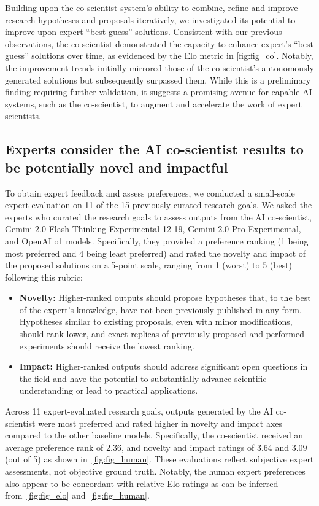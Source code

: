 Building upon the co-scientist system's ability to combine, refine and improve research hypotheses and proposals iteratively, we investigated its potential to improve upon expert ``best guess'' solutions. Consistent with our previous observations, the co-scientist demonstrated the capacity to enhance expert's ``best guess'' solutions over time, as evidenced by the Elo metric in \cref{fig:fig_co}. Notably, the improvement trends initially mirrored those of the co-scientist's autonomously generated solutions but subsequently surpassed them. While this is a preliminary finding requiring further validation, it suggests a promising avenue for capable AI systems, such as the co-scientist, to augment and accelerate the work of expert scientists.


\subsection{Experts consider the AI co-scientist results to be potentially novel and impactful}

To obtain expert feedback and assess preferences, we conducted a small-scale expert evaluation on 11 of the 15 previously curated research goals. We asked the experts who curated the research goals to assess outputs from the AI co-scientist, Gemini 2.0 Flash Thinking Experimental 12-19, Gemini 2.0 Pro Experimental, and OpenAI o1 models. Specifically, they provided a preference ranking (1 being most preferred and 4 being least preferred) and rated the novelty and impact of the proposed solutions on a 5-point scale, ranging from 1 (worst) to 5 (best) following this rubric:
\begin{itemize}
    \item \textbf{Novelty:} Higher-ranked outputs should propose hypotheses that, to the best of the expert's knowledge, have not been previously published in any form. Hypotheses similar to existing proposals, even with minor modifications, should rank lower, and exact replicas of previously proposed and performed experiments should receive the lowest ranking.
    \item \textbf{Impact:} Higher-ranked outputs should address significant open questions in the field and have the potential to substantially advance scientific understanding or lead to practical applications.
\end{itemize}

Across 11 expert-evaluated research goals, outputs generated by the AI co-scientist were most preferred and rated higher in novelty and impact axes compared to the other baseline models. Specifically, the co-scientist received an average preference rank of 2.36, and novelty and impact ratings of 3.64 and 3.09 (out of 5) as shown in~\cref{fig:fig_human}. These evaluations reflect subjective expert assessments, not objective ground truth. Notably, the human expert preferences also appear to be concordant with relative Elo ratings as can be inferred from~\cref{fig:fig_elo} and~\cref{fig:fig_human}.

